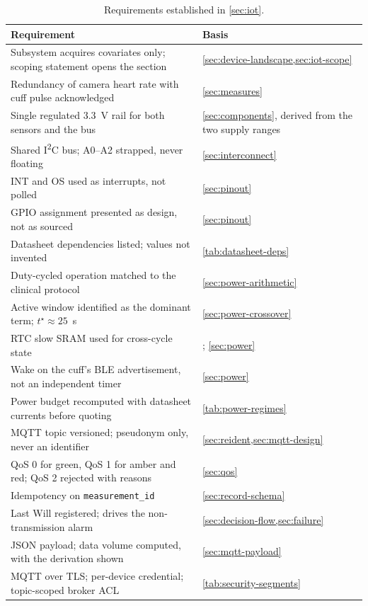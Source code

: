 \documentclass[12pt,a4paper,oneside]{report}
\begin{document}
\begin{table}[htbp]
\centering\footnotesize
\caption{Requirements established in \cref{sec:iot}.}\label{tab:spec42}
\begin{tabularx}{\textwidth}{@{}X >{\raggedright\arraybackslash}p{5.0cm}@{}}
\toprule
\textbf{Requirement} & \textbf{Basis} \\
\midrule
Subsystem acquires covariates only; scoping statement opens the section & \cref{sec:device-landscape,sec:iot-scope} \\
Redundancy of camera heart rate with cuff pulse acknowledged & \cref{sec:measures} \\
Single regulated 3.3~V rail for both sensors and the bus & \cref{sec:components}, derived from the two supply ranges \\
Shared I\textsuperscript{2}C bus; A0--A2 strapped, never floating & \cref{sec:interconnect} \\
INT and OS used as interrupts, not polled & \cref{sec:pinout} \\
GPIO assignment presented as design, not as sourced & \cref{sec:pinout} \\
Datasheet dependencies listed; values not invented & \cref{tab:datasheet-deps} \\
Duty-cycled operation matched to the clinical protocol & \cref{sec:power-arithmetic} \\
Active window identified as the dominant term; $t^\star \approx 25$~s & \cref{sec:power-crossover} \\
RTC slow SRAM used for cross-cycle state & \textcite{efendi2025}; \cref{sec:power} \\
Wake on the cuff's BLE advertisement, not an independent timer & \cref{sec:power} \\
Power budget recomputed with datasheet currents before quoting & \cref{tab:power-regimes} \\
MQTT topic versioned; pseudonym only, never an identifier & \cref{sec:reident,sec:mqtt-design} \\
QoS 0 for green, QoS 1 for amber and red; QoS 2 rejected with reasons & \cref{sec:qos} \\
Idempotency on \texttt{measurement\_id} & \cref{sec:record-schema} \\
Last Will registered; drives the non-transmission alarm & \cref{sec:decision-flow,sec:failure} \\
JSON payload; data volume computed, with the derivation shown & \cref{sec:mqtt-payload} \\
MQTT over TLS; per-device credential; topic-scoped broker ACL & \cref{tab:security-segments} \\

\end{tabularx}
\end{table}
\end{document}
